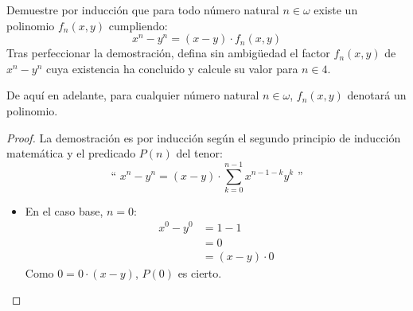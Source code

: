 \begin{ejercicio}
    Demuestre por inducción que para todo número natural $n\in\omega$ existe un polinomio $f_n(x, y)$ cumpliendo:
    \begin{equation*}
        x^n - y^n = (x-y)\cdot f_n(x, y)
    \end{equation*}
    Tras perfeccionar la demostración, defina sin ambigüedad el factor $f_n(x, y)$ de $x^n - y^n$ cuya existencia ha concluido y calcule su valor para $n\in 4$.

    \begin{notacion}
        De aquí en adelante, para cualquier número natural $n\in\omega$, $f_n(x, y)$ denotará un polinomio.
    \end{notacion}
    \begin{proof}
        La demostración es por inducción según el segundo principio de inducción matemática y el predicado $P(n)$ del tenor:
        \begin{equation*}
            \text{`` }x^n - y^n = (x-y)\cdot \sum_{k=0}^{n-1}x^{n-1-k}y^k\text{ ''}
        \end{equation*}

        \begin{itemize}
            \item En el caso base, $n=0$:
                \begin{align*}
                    x^0 - y^0 &= 1 - 1 \\&= 0 \\&= (x-y)\cdot 0
                \end{align*}
                Como $0 = 0\cdot (x-y)$, $P(0)$ es cierto.


\end{itemize}
\end{proof}
\end{ejercicio}
